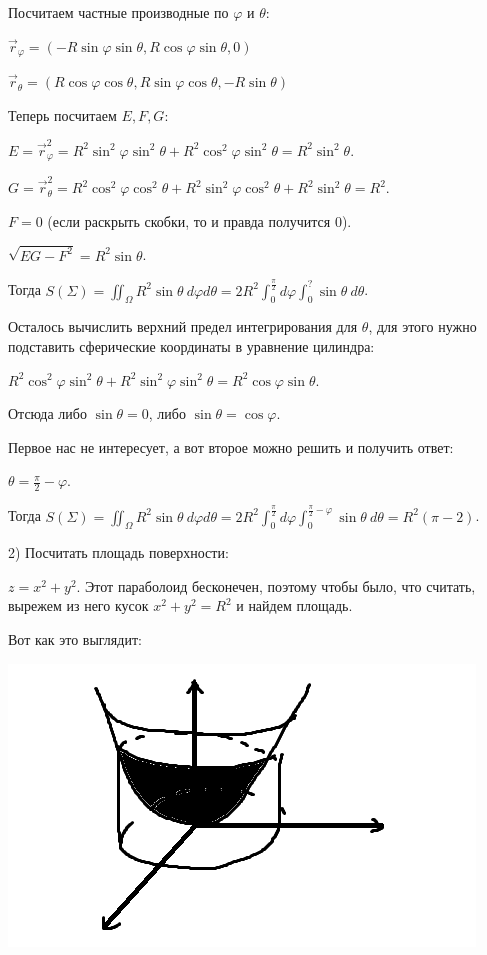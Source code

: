\documentclass[12pt]{article}
\begin{document}
Посчитаем частные производные по $\varphi$ и $\theta$:\par
$\overrightarrow{r}_\varphi = (-R \sin \varphi \sin \theta, R\cos\varphi \sin \theta, 0)$\par
$\overrightarrow{r}_\theta = (R\cos\varphi \cos\theta, R\sin\varphi \cos\theta, -R\sin\theta)$\par
Теперь посчитаем $E, F, G$:\par
$E = \overrightarrow{r}_\varphi^2 = R^2 \sin^2 \varphi \sin^2 \theta + R^2 \cos^2 \varphi \sin^2 \theta = R^2 \sin^2 \theta$.\par
$G = \overrightarrow{r}_\theta^2 = R^2 \cos^2 \varphi \cos^2 \theta + R^2 \sin^2 \varphi \cos^2 \theta + R^2 \sin^2 \theta = R^2$.\par
$F = 0$ (если раскрыть скобки, то и правда получится 0).\par
$\sqrt{EG-F^2} = R^2 \sin\theta$.\par
Тогда $S(\Sigma) = \iint_\Omega R^2 \sin\theta \ d\varphi d\theta = 2 R^2 \int_0^{\frac{\pi}{2}} d\varphi \int_0^? \sin\theta \ d\theta$.\par
Осталось вычислить верхний предел интегрирования для $\theta$, для этого нужно подставить сферические координаты в уравнение цилиндра:\par
$R^2 \cos^2 \varphi \sin^2 \theta + R^2 \sin^2 \varphi \sin^2\theta = R^2 \cos\varphi \sin\theta$.\par
Отсюда либо $\sin\theta = 0$, либо $\sin\theta = \cos\varphi$.\par
Первое нас не интересует, а вот второе можно решить и получить ответ:\par
$\theta = \frac{\pi}{2} - \varphi$.\par
Тогда $S(\Sigma) = \iint_\Omega R^2 \sin\theta \ d\varphi d\theta = 2 R^2 \int_0^{\frac{\pi}{2}} d\varphi \int_0^{\frac{\pi}{2} - \varphi} \sin\theta \ d\theta = R^2(\pi - 2)$.\par
2) Посчитать площадь поверхности:\par
$z = x^2 + y^2$. Этот параболоид бесконечен, поэтому чтобы было, что считать, вырежем из него кусок $x^2 + y^2 = R^2$ и найдем площадь.\par
Вот как это выглядит:\par
\includegraphics{paraboloidAndCylindr1}\par
\end{document}
